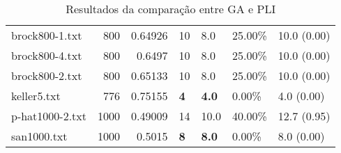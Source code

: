 \begin{table}[h]
\begin{tabular}{lrrllll}
 brock800-1.txt     &     800 &     0.64926 & 10           & 8.0             & 25.00\%  & 10.0 (0.00)    \\
 brock800-4.txt     &     800 &     0.6497  & 10           & 8.0             & 25.00\%  & 10.0 (0.00)    \\
 brock800-2.txt     &     800 &     0.65133 & 10           & 8.0             & 25.00\%  & 10.0 (0.00)    \\
 keller5.txt        &     776 &     0.75155 & \textbf{4}   & \textbf{4.0}    & 0.00\%   & 4.0 (0.00)     \\
 p-hat1000-2.txt    &    1000 &     0.49009 & 14           & 10.0            & 40.00\%  & 12.7 (0.95)    \\
 san1000.txt        &    1000 &     0.5015  & \textbf{8}   & \textbf{8.0}    & 0.00\%   & 8.0 (0.00)     \\
\hline
\end{tabular}
    \caption{Resultados da comparação entre GA e PLI}
    \label{tab:results}
\end{table}
